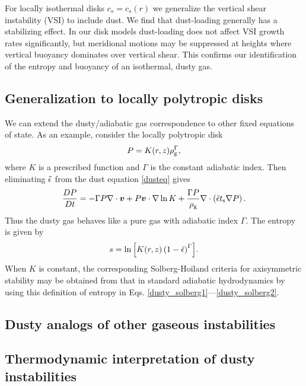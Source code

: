 
For locally isothermal disks $c_s=c_s(r)$ we generalize the vertical
shear instability (VSI) to include dust. We find that dust-loading
generally has a stabilizing effect. In our disk models
dust-loading does not affect VSI growth rates significantly, but
meridional motions may be suppressed at heights where vertical 
buoyancy dominates over vertical shear. This confirms our 
identification of the entropy and buoyancy of an isothermal, dusty
gas.  


\subsection{Generalization to locally polytropic disks}
We can extend the dusty/adiabatic gas correspondence to 
other fixed equations of state. As an example, consider the locally
polytropic disk 
\begin{align}
  P = K(r,z)\rho_\mathrm{g}^{\Gamma}, 
\end{align}
where $K$ is a prescribed function and $\Gamma$ is the constant
adiabatic index. Then eliminating $\tilde{\epsilon}$ from the dust equation
\ref{dusteq} gives 
\begin{align}
  \frac{D P}{D t} = - \Gamma P\nabla\cdot\bm{v}  + P \bm{v}\cdot\nabla \ln{K}
  + \frac{\Gamma P}{\rho_\mathrm{g}}\nabla\cdot\left(\tilde{\epsilon}t_\mathrm{s}\nabla
  P\right).
\end{align}
Thus the dusty gas behaves like a pure gas with adiabatic index
$\Gamma$. The entropy is given by 
\begin{align}
  s = \ln{\left[K(r,z)\left(1 - \tilde{\epsilon}\right)^\Gamma\right]}.  
\end{align}
When $K$ is constant, the corresponding Solberg-Hoiland criteria for
axisymmetric stability may be obtained from that in standard adiabatic 
hydrodynamics \citep[e.g.][]{tassoul78} by
using this definition of entropy in
Eqs. \ref{dusty_solberg1}---\ref{dusty_solberg2}. 

\subsection{Dusty analogs of other gaseous instabilities} 
 



\subsection{Thermodynamic interpretation of dusty instabilities}


